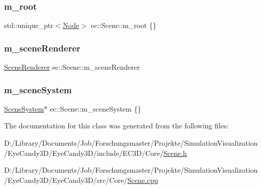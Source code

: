 \subsubsection{\texorpdfstring{m\+\_\+root}{m\_root}}
{\footnotesize\ttfamily std\+::unique\+\_\+ptr$<$\mbox{\hyperlink{classec_1_1_node}{Node}}$>$ ec\+::\+Scene\+::m\+\_\+root \{\}\hspace{0.3cm}{\ttfamily [protected]}}

\mbox{\label{classec_1_1_scene_a17a2c241cec6bda0a5895b353aa28fa7}} 
\subsubsection{\texorpdfstring{m\+\_\+scene\+Renderer}{m\_sceneRenderer}}
{\footnotesize\ttfamily \mbox{\hyperlink{classec_1_1_scene_renderer}{Scene\+Renderer}} ec\+::\+Scene\+::m\+\_\+scene\+Renderer\hspace{0.3cm}{\ttfamily [protected]}}

\mbox{\label{classec_1_1_scene_ad63e472baf8e283c596891384ea98aad}} 
\subsubsection{\texorpdfstring{m\+\_\+scene\+System}{m\_sceneSystem}}
{\footnotesize\ttfamily \mbox{\hyperlink{classec_1_1_scene_system}{Scene\+System}}$\ast$ ec\+::\+Scene\+::m\+\_\+scene\+System \{\}\hspace{0.3cm}{\ttfamily [protected]}}



The documentation for this class was generated from the following files\+:\begin{DoxyCompactItemize}
\item 
D\+:/\+Library/\+Documents/\+Job/\+Forschungsmaster/\+Projekte/\+Simulation\+Visualization/\+Eye\+Candy3\+D/\+Eye\+Candy3\+D/include/\+E\+C3\+D/\+Core/\mbox{\hyperlink{_scene_8h}{Scene.\+h}}\item 
D\+:/\+Library/\+Documents/\+Job/\+Forschungsmaster/\+Projekte/\+Simulation\+Visualization/\+Eye\+Candy3\+D/\+Eye\+Candy3\+D/src/\+Core/\mbox{\hyperlink{_scene_8cpp}{Scene.\+cpp}}\end{DoxyCompactItemize}
